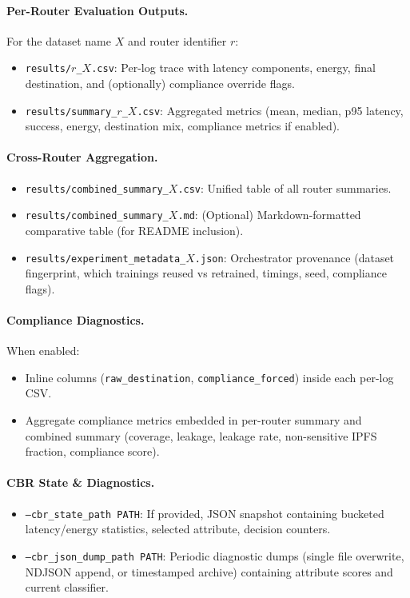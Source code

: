 \paragraph{Per-Router Evaluation Outputs.}
For the dataset name $X$ and router identifier $r$:
\begin{itemize}
  \item \texttt{results/}$r$\texttt{\_}$X$\texttt{.csv}: Per-log trace with latency components, energy, final destination, and (optionally) compliance override flags.
  \item \texttt{results/summary\_}$r$\texttt{\_}$X$\texttt{.csv}: Aggregated metrics (mean, median, p95 latency, success, energy, destination mix, compliance metrics if enabled).
\end{itemize}

\paragraph{Cross-Router Aggregation.}
\begin{itemize}
  \item \texttt{results/combined\_summary\_}$X$\texttt{.csv}: Unified table of all router summaries.
  \item \texttt{results/combined\_summary\_}$X$\texttt{.md}: (Optional) Markdown-formatted comparative table (for README inclusion).
  \item \texttt{results/experiment\_metadata\_}$X$\texttt{.json}: Orchestrator provenance (dataset fingerprint, which trainings reused vs retrained, timings, seed, compliance flags).
\end{itemize}

\paragraph{Compliance Diagnostics.}
When enabled:
\begin{itemize}
  \item Inline columns (\texttt{raw\_destination}, \texttt{compliance\_forced}) inside each per-log CSV.
  \item Aggregate compliance metrics embedded in per-router summary and combined summary (coverage, leakage, leakage rate, non-sensitive IPFS fraction, compliance score).
\end{itemize}

\paragraph{CBR State \& Diagnostics.}
\begin{itemize}
  \item \texttt{--cbr\_state\_path PATH}: If provided, JSON snapshot containing bucketed latency/energy statistics, selected attribute, decision counters.
  \item \texttt{--cbr\_json\_dump\_path PATH}: Periodic diagnostic dumps (single file overwrite, NDJSON append, or timestamped archive) containing attribute scores and current classifier.
\end{itemize}


